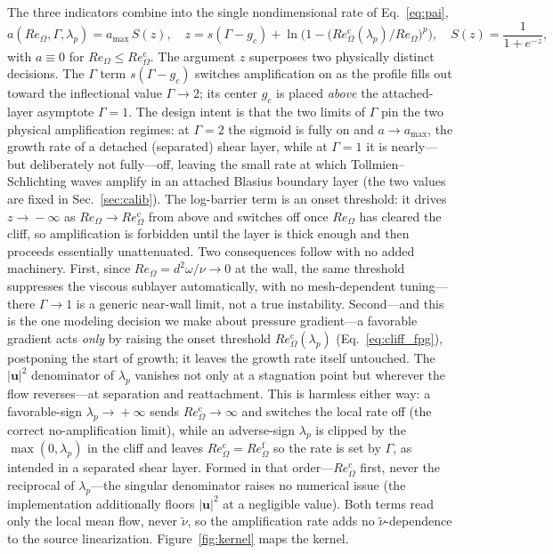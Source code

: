 \documentclass[journal]{new-aiaa}
\begin{document}
The three indicators combine into the single nondimensional rate of
Eq.~\eqref{eq:pai},
\begin{equation}
  a(Re_\Omega,\Gamma,\lambda_p) = a_{\max}\,S(z),
  \quad
  z = s(\Gamma-g_c) + \ln\!\Big(1-\big(Re_\Omega^{\mathrm{c}}(\lambda_p)/Re_\Omega\big)^{p}\Big),
  \quad S(z)=\frac{1}{1+e^{-z}},
  \label{eq:rate}
\end{equation}
with $a\equiv0$ for $Re_\Omega\le Re_\Omega^{\mathrm{c}}$.
The argument $z$ superposes two physically distinct decisions. The
$\Gamma$ term $s(\Gamma-g_c)$ switches amplification on as the profile fills out
toward the inflectional value $\Gamma\!\to\!2$; its center $g_c$ is placed
\emph{above} the attached-layer asymptote $\Gamma\!=\!1$. The design intent
is that the two limits of $\Gamma$ pin the two physical amplification regimes: at
$\Gamma\!=\!2$ the sigmoid is fully on and $a\!\to\!a_{\max}$, the growth rate of a
detached (separated) shear layer, while at $\Gamma\!=\!1$ it is nearly---but
deliberately not fully---off, leaving the small rate at which Tollmien--Schlichting
waves amplify in an attached Blasius boundary layer (the two values are fixed in
Sec.~\ref{sec:calib}). The log-barrier
term is an onset threshold: it drives $z\!\to\!-\infty$ as
$Re_\Omega\!\to\!Re_\Omega^{\mathrm{c}}$ from above and switches off once
$Re_\Omega$ has cleared the cliff, so amplification is forbidden until the layer
is thick enough and then proceeds essentially unattenuated. Two consequences
follow with no added machinery. First, since
$Re_\Omega\!=\!d^2\omega/\nu\!\to\!0$ at the wall, the same threshold suppresses
the viscous sublayer automatically, with no mesh-dependent tuning---there
$\Gamma\!\to\!1$ is a generic near-wall limit, not a true instability. Second---and this is the one modeling decision we make about
pressure gradient---a favorable gradient acts \emph{only} by raising the onset
threshold $Re_\Omega^{\mathrm{c}}(\lambda_p)$ (Eq.~\eqref{eq:cliff_fpg}),
postponing the start of growth; it leaves the growth rate itself untouched. The
$|\mathbf{u}|^2$ denominator of $\lambda_p$ vanishes not only at a stagnation point
but wherever the flow reverses---at separation and reattachment. This is harmless
either way: a favorable-sign $\lambda_p\!\to\!+\infty$ sends
$Re_\Omega^{\mathrm{c}}\!\to\!\infty$ and switches the local rate off (the correct
no-amplification limit), while an adverse-sign $\lambda_p$ is clipped by the
$\max(0,\lambda_p)$ in the cliff and leaves $Re_\Omega^{\mathrm{c}}\!=\!
Re_\Omega^{\mathrm{f}}$ so the rate is set by $\Gamma$, as intended in a separated
shear layer. Formed in that order---$Re_\Omega^{\mathrm{c}}$ first, never the
reciprocal of $\lambda_p$---the singular denominator raises no numerical issue
(the implementation additionally floors $|\mathbf{u}|^2$ at a negligible
value). Both terms read only the local mean flow, never
$\tilde\nu$, so the amplification rate adds no $\tilde\nu$-dependence to the
source linearization. Figure~\ref{fig:kernel} maps the kernel.
\end{document}
